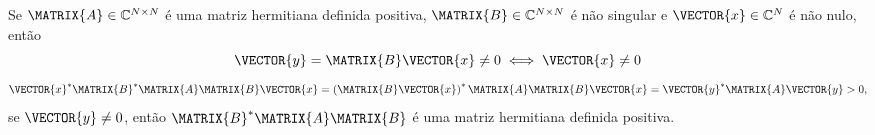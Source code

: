 \begin{myproofT}\label{proof:theo:prophermitianpositivematrix1:b}
Se $\MATRIX{A} \in \mathbb{C}^{N \times N}$ é uma matriz hermitiana definida positiva, 
$\MATRIX{B} \in \mathbb{C}^{N \times N}$ é não singular e
$\VECTOR{x} \in \mathbb{C}^{N}$ é não nulo, então
\begin{equation}
\VECTOR{y}=\MATRIX{B}\VECTOR{x}\neq 0 \iff \VECTOR{x}\neq 0
\end{equation}
\begin{equation}
\VECTOR{x}^{\ast} \MATRIX{B}^{\ast} \MATRIX{A} \MATRIX{B} \VECTOR{x} =
\left(\MATRIX{B}\VECTOR{x}\right)^{\ast} \MATRIX{A} \MATRIX{B} \VECTOR{x} =
\VECTOR{y}^{\ast} \MATRIX{A} \VECTOR{y}>0,
\end{equation}
se $\VECTOR{y}\neq 0$, então $\MATRIX{B}^{\ast} \MATRIX{A} \MATRIX{B}$
é uma matriz hermitiana definida positiva.
\end{myproofT}


